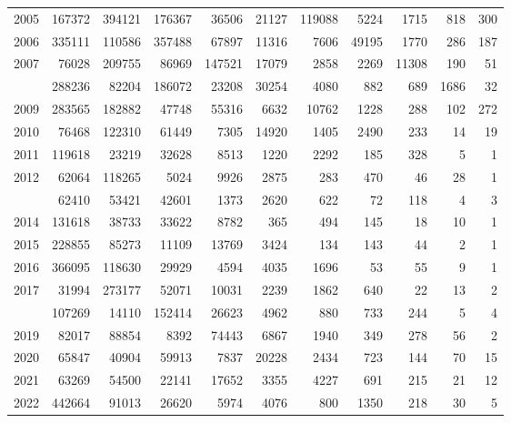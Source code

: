 \documentclass[
]{article}
\begin{document}
\begin{longtable}[t]{lrrrrrrrrrr}
2005 & 167372 & 394121 & 176367 & 36506 & 21127 & 119088 & 5224 & 1715 & 818 & 300\\
2006 & 335111 & 110586 & 357488 & 67897 & 11316 & 7606 & 49195 & 1770 & 286 & 187\\
2007 & 76028 & 209755 & 86969 & 147521 & 17079 & 2858 & 2269 & 11308 & 190 & 51\\
\addlinespace
2008 & 288236 & 82204 & 186072 & 23208 & 30254 & 4080 & 882 & 689 & 1686 & 32\\
2009 & 283565 & 182882 & 47748 & 55316 & 6632 & 10762 & 1228 & 288 & 102 & 272\\
2010 & 76468 & 122310 & 61449 & 7305 & 14920 & 1405 & 2490 & 233 & 14 & 19\\
2011 & 119618 & 23219 & 32628 & 8513 & 1220 & 2292 & 185 & 328 & 5 & 1\\
2012 & 62064 & 118265 & 5024 & 9926 & 2875 & 283 & 470 & 46 & 28 & 1\\
\addlinespace
2013 & 62410 & 53421 & 42601 & 1373 & 2620 & 622 & 72 & 118 & 4 & 3\\
2014 & 131618 & 38733 & 33622 & 8782 & 365 & 494 & 145 & 18 & 10 & 1\\
2015 & 228855 & 85273 & 11109 & 13769 & 3424 & 134 & 143 & 44 & 2 & 1\\
2016 & 366095 & 118630 & 29929 & 4594 & 4035 & 1696 & 53 & 55 & 9 & 1\\
2017 & 31994 & 273177 & 52071 & 10031 & 2239 & 1862 & 640 & 22 & 13 & 2\\
\addlinespace
2018 & 107269 & 14110 & 152414 & 26623 & 4962 & 880 & 733 & 244 & 5 & 4\\
2019 & 82017 & 88854 & 8392 & 74443 & 6867 & 1940 & 349 & 278 & 56 & 2\\
2020 & 65847 & 40904 & 59913 & 7837 & 20228 & 2434 & 723 & 144 & 70 & 15\\
2021 & 63269 & 54500 & 22141 & 17652 & 3355 & 4227 & 691 & 215 & 21 & 12\\
2022 & 442664 & 91013 & 26620 & 5974 & 4076 & 800 & 1350 & 218 & 30 & 5\\*
\end{longtable}
\end{document}
